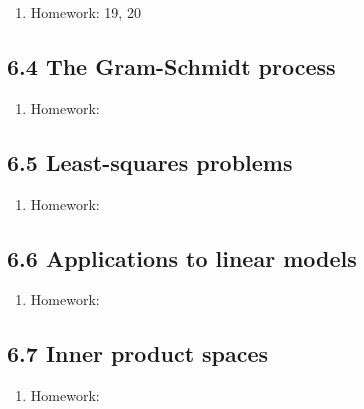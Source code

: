 \documentclass{article}
\begin{document}
\begin{enumerate}

\item Homework: 19, 20

\end{enumerate}

\subsection{6.4 The Gram-Schmidt process}

\begin{enumerate}

\item Homework: 

\end{enumerate}

\subsection{6.5 Least-squares problems}

\begin{enumerate}

\item Homework: 

\end{enumerate}

\subsection{6.6 Applications to linear models}

\begin{enumerate}

\item Homework: 

\end{enumerate}

\subsection{6.7 Inner product spaces}

\begin{enumerate}

\item Homework: 

\end{enumerate}
\end{document}
